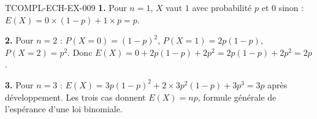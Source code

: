 \begin{corrige}{TCOMPL-ECH-EX-009}
\textbf{1.} Pour $n=1$, $X$ vaut $1$ avec probabilité $p$ et $0$ sinon :
$E(X)=0\times(1-p)+1\times p=p$.

\textbf{2.} Pour $n=2$ : $P(X=0)=(1-p)^2$, $P(X=1)=2p(1-p)$,
$P(X=2)=p^2$. Donc
$E(X)=0+2p(1-p)+2p^2=2p(1-p)+2p^2=2p$.

\textbf{3.} Pour $n=3$ : $E(X)=3p(1-p)^2+2\times3p^2(1-p)+3p^3=3p$ après
développement. Les trois cas donnent $E(X)=np$, formule générale de
l'espérance d'une loi binomiale.
\end{corrige}
